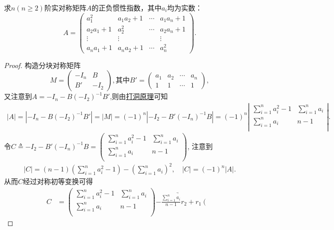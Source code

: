 \documentclass[../../main.tex]{subfiles}
\begin{document}
\begin{proposition}
求\(n(n\geqslant 2)\)阶实对称矩阵\(A\)的正负惯性指数，其中\(a_i\)均为实数：
\[
A = \begin{pmatrix}
a_1^2 & a_1a_2 + 1 & \cdots & a_1a_n + 1 \\
a_2a_1 + 1 & a_2^2 & \cdots & a_2a_n + 1 \\
\vdots & \vdots & & \vdots \\
a_na_1 + 1 & a_na_2 + 1 & \cdots & a_n^2
\end{pmatrix}.
\]
\end{proposition} 
\begin{proof}
构造分块对称矩阵
\[
M = \begin{pmatrix}
-I_n & B \\
B' & -I_2
\end{pmatrix}, \text{其中} B' = \begin{pmatrix}
a_1 & a_2 & \cdots & a_n \\
1 & 1 & \cdots & 1
\end{pmatrix},
\]
又注意到$A=-I_n-B(-I_2)^{-1}B'$,则由\hyperref[proposition:打洞原理]{打洞原理}可知
\begin{align*}
\left| A \right|=\left| -I_n-B(-I_2)^{-1}B' \right|=\left| M \right|=\left( -1 \right) ^n\left| -I_2-B' (-I_n)^{-1}B \right|=\left( -1 \right) ^n\left| \begin{matrix}
\sum_{i=1}^n{a_{i}^{2}}-1&		\sum_{i=1}^n{a_i}\\
\sum_{i=1}^n{a_i}&		n-1\\
\end{matrix} \right|.
\end{align*}
令$C\triangleq -I_2-B' (-I_n)^{-1}B=\left( \begin{matrix}
\sum_{i=1}^n{a_{i}^{2}}-1&		\sum_{i=1}^n{a_i}\\
\sum_{i=1}^n{a_i}&		n-1\\
\end{matrix} \right) $,
注意到
\begin{align*}
|C|=\left( n-1 \right) \left( \sum_{i=1}^n{a_{i}^{2}}-1 \right) -\left( \sum_{i=1}^n{a_i} \right) ^2,\quad |C|=(-1)^n|A|.
\end{align*}
从而$C$经过对称初等变换可得
\begin{align*}
C&=\left( \begin{matrix}
\sum_{i=1}^n{a_{i}^{2}}-1&		\sum_{i=1}^n{a_i}\\
\sum_{i=1}^n{a_i}&		n-1\\
\end{matrix} \right) \underrightarrow{-\frac{\sum\limits_{i=1}^n{a_i}}{n-1}r_2+r_1}\left( \begin{matrix}

\end{matrix}
\end{align*}
\end{proof}
\end{document}
